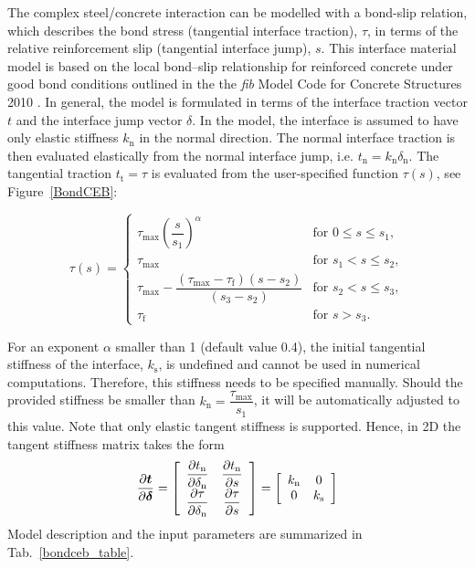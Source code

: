 \documentclass[a4paper]{article}
\newcommand{\mbf}[1]{\mbox{\boldmath$#1$}}
\begin{document}
The complex steel/concrete interaction can be modelled with a bond-slip relation, which describes the bond stress (tangential interface traction), $\tau$, in terms of the relative reinforcement slip (tangential interface jump), $s$. This interface material model is based on the local bond--slip relationship for reinforced concrete under good bond conditions outlined in the the \textit{fib} Model Code for Concrete Structures 2010 \cite{fib:2010}.
In general, the model is formulated in terms of the interface traction vector \mbf{t} and the interface jump vector \mbf{\delta}.
In the model, the interface is assumed to have only elastic stiffness $k_\text{n}$ in the normal direction. The normal interface traction is then evaluated elastically from the normal interface jump, i.e. $t_\text{n} =  k_\text{n} \delta_\text{n}$. The tangential traction $t_\text{t} = \tau$ is evaluated from the user-specified function $\tau (s)$, see Figure~\ref{BondCEB}:

\begin{equation}
\tau (s) = \begin{cases}
	\tau_\text{max} \left( \dfrac{s}{s_1} \right) ^ \alpha & \text{for } 0 \leq s \leq s_1, \\
	\tau_\text{max} & \text{for } s_1 < s \leq s_2, \\
	\tau_\text{max} - \dfrac{\left( \tau_\text{max} - \tau_\text{f} \right) \left(s-s_2 \right)}{\left( s_3 - s_2 \right)} & \text{for } s_2 < s \leq s_3, \\
	\tau_\text{f} & \text{for } s > s_3.
	\end{cases}
\end{equation}

\noindent For an exponent $\alpha$ smaller than 1 (default value 0.4), the initial tangential stiffness of the interface, $k_\text{s}$, is undefined and cannot be used in numerical computations. Therefore, this stiffness needs to be specified manually. Should the provided stiffness be smaller than $k_\text{n} = \dfrac{\tau_\text{max}}{s_1}$, it will be automatically adjusted to this value. Note that only elastic tangent stiffness is supported. Hence, in 2D the tangent stiffness matrix takes the form
\begin{equation}
\dfrac{\partial \mbf{t}}{\partial \mbf{\delta}}= \left[ \begin{array}{cc}
\dfrac{\partial t_\text{n}}{\partial \delta_\text{n}} &
\dfrac{\partial t_\text{n}}{\partial s} \\
\dfrac{\partial \tau}{\partial \delta_\text{n}} & \dfrac{\partial \tau}{\partial s}
\end{array} \right] =
\left[ \begin{array}{cc}
k_\text{n} & 0 \\ 0 & k_\text{s}
\end{array} \right]
\end{equation}
Model description and the input parameters are summarized in Tab.~\ref{bondceb_table}.
\end{document}
